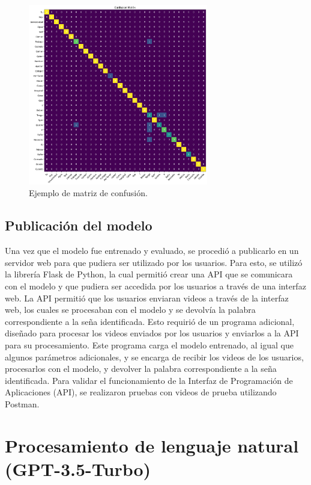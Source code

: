 \begin{figure}[H]
    \centering
    \includegraphics[width=0.7\textwidth]{figuras/ConfusionMatrixExample.png}
    \caption{Ejemplo de matriz de confusión.}
    \label{fig:confusion_matrix}
\end{figure}

\subsection{Publicación del modelo}
Una vez que el modelo fue entrenado y evaluado, se procedió a publicarlo en un servidor web para que pudiera ser utilizado por los usuarios.
Para esto, se utilizó la librería Flask de Python, la cual permitió crear una API que se comunicara con el modelo y que pudiera ser accedida por los usuarios a través de una interfaz web.
La API permitió que los usuarios enviaran videos a través de la interfaz web, los cuales se procesaban con el modelo y se devolvía la palabra correspondiente a la seña identificada.
Esto requirió de un programa adicional, diseñado para procesar los videos enviados por los usuarios y enviarlos a la API para su procesamiento.
Este programa carga el modelo entrenado, al igual que algunos parámetros adicionales, y se encarga de recibir los videos de los usuarios, procesarlos con el modelo, y devolver la palabra correspondiente a la seña identificada.
Para validar el funcionamiento de la Interfaz de Programación de Aplicaciones (API), se realizaron pruebas con videos de prueba utilizando Postman.





\section{Procesamiento de lenguaje natural (GPT-3.5-Turbo)} 



